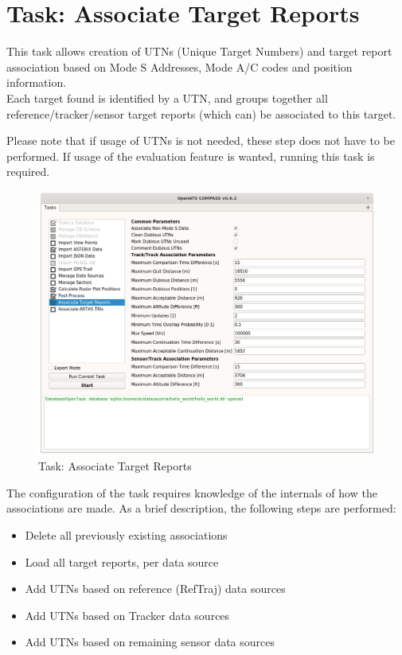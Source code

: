 \section{Task: Associate Target Reports}
\label{sec:task_associate_tr} 

This task allows creation of UTNs (Unique Target Numbers) and target report association based on Mode S Addresses, Mode A/C codes and position information. \\

Each target found is identified by a UTN, and groups together all reference/tracker/sensor target reports (which can) be associated to this target.

Please note that if usage of UTNs is not needed, these step does not have to be performed. If usage of the evaluation feature is wanted, running this task is required. \\

\begin{figure}[H]
  \hspace*{-2.5cm}
    \includegraphics[width=19cm]{../screenshots/tr_association_config.png}
  \caption{Task: Associate Target Reports}
\end{figure}

The configuration of the task requires knowledge of the internals of how the associations are made. As a brief description, the following steps are performed:

\begin{itemize}
\item Delete all previously existing associations
\item Load all target reports, per data source
\item Add UTNs based on reference (RefTraj) data sources
\item Add UTNs based on Tracker data sources
\item Add UTNs based on remaining sensor data sources
\end{itemize}
\ \\

